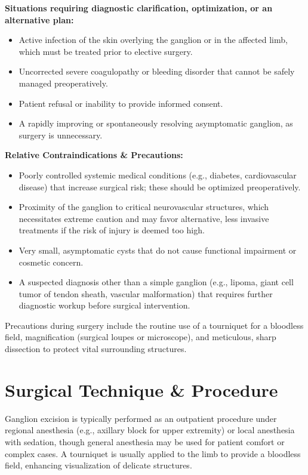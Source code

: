 \textbf{Situations requiring diagnostic clarification, optimization, or an alternative plan:}

\begin{itemize}
  \item Active infection of the skin overlying the ganglion or in the affected limb, which must be treated prior to elective surgery.
  \item Uncorrected severe coagulopathy or bleeding disorder that cannot be safely managed preoperatively.
  \item Patient refusal or inability to provide informed consent.
  \item A rapidly improving or spontaneously resolving asymptomatic ganglion, as surgery is unnecessary.
\end{itemize}

\textbf{Relative Contraindications \& Precautions:}

\begin{itemize}
  \item Poorly controlled systemic medical conditions (e.g., diabetes, cardiovascular disease) that increase surgical risk; these should be optimized preoperatively.
  \item Proximity of the ganglion to critical neurovascular structures, which necessitates extreme caution and may favor alternative, less invasive treatments if the risk of injury is deemed too high.
  \item Very small, asymptomatic cysts that do not cause functional impairment or cosmetic concern.
  \item A suspected diagnosis other than a simple ganglion (e.g., lipoma, giant cell tumor of tendon sheath, vascular malformation) that requires further diagnostic workup before surgical intervention.
\end{itemize}

Precautions during surgery include the routine use of a tourniquet for a bloodless field, magnification (surgical loupes or microscope), and meticulous, sharp dissection to protect vital surrounding structures.

\section*{Surgical Technique \& Procedure}
Ganglion excision is typically performed as an outpatient procedure under regional anesthesia (e.g., axillary block for upper extremity) or local anesthesia with sedation, though general anesthesia may be used for patient comfort or complex cases. A tourniquet is usually applied to the limb to provide a bloodless field, enhancing visualization of delicate structures.

